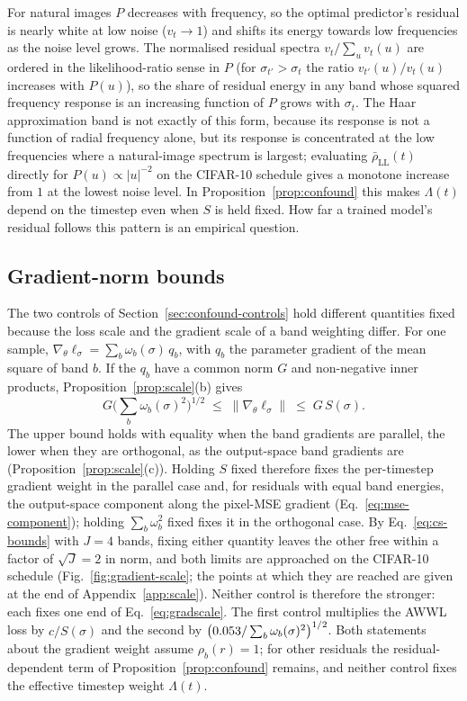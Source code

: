 For natural images $P$ decreases with frequency, so the optimal predictor's
residual is nearly white at low noise ($v_t \to 1$) and shifts its energy
towards low frequencies as the noise level grows. The normalised residual
spectra $v_t/\sum_u v_t(u)$ are ordered in the likelihood-ratio sense in $P$
(for $\sigma_{t'} > \sigma_t$ the ratio $v_{t'}(u)/v_t(u)$ increases with
$P(u)$), so the share of residual energy in any band whose squared frequency
response is an increasing function of $P$ grows with $\sigma_t$. The Haar
approximation band is not exactly of this form, because its response is not a
function of radial frequency alone, but its response is concentrated at the
low frequencies where a natural-image spectrum is largest; evaluating
$\bar\rho_{\mathrm{LL}}(t)$ directly for $P(u) \propto \lvert u \rvert^{-2}$ on
the CIFAR-10 schedule gives a monotone increase from $1$ at the lowest noise
level. In Proposition~\ref{prop:confound} this makes $\Lambda(t)$ depend on the
timestep even when $S$ is held fixed. How far a trained model's residual
follows this pattern is an empirical question.

\subsection{Gradient-norm bounds}
\label{app:gradnorm}

The two controls of Section~\ref{sec:confound-controls} hold different
quantities fixed because the loss scale and the gradient scale of a band
weighting differ. For one sample,
$\nabla_\theta \ell_\sigma = \sum_b \omega_b(\sigma)\, q_b$, with $q_b$ the
parameter gradient of the mean square of band $b$. If the $q_b$ have a common
norm $G$ and non-negative inner products, Proposition~\ref{prop:scale}(b)
gives
\begin{equation}
  G \Big(\sum_b \omega_b(\sigma)^2\Big)^{1/2}
  \;\le\; \lVert \nabla_\theta \ell_\sigma \rVert
  \;\le\; G\, S(\sigma).
  \label{eq:gradscale}
\end{equation}
The upper bound holds with equality when the band gradients are parallel, the
lower when they are orthogonal, as the output-space band gradients are
(Proposition~\ref{prop:scale}(c)). Holding $S$ fixed therefore fixes the
per-timestep gradient weight in the parallel case and, for residuals with
equal band energies, the output-space component along the pixel-MSE gradient
(Eq.~\eqref{eq:mse-component}); holding $\sum_b \omega_b^2$ fixed fixes it in
the orthogonal case. By Eq.~\eqref{eq:cs-bounds} with $J = 4$ bands, fixing
either quantity leaves the other free within a factor of $\sqrt{J} = 2$ in
norm, and both limits are approached on the CIFAR-10 schedule
(Fig.~\ref{fig:gradient-scale}; the points at which they are reached are given
at the end of Appendix~\ref{app:scale}). Neither control is therefore the
stronger: each fixes one end of Eq.~\eqref{eq:gradscale}. The first control
multiplies the AWWL loss by $c/S(\sigma)$ and the second by
$\big(0.053 / \sum_b \omega_b(\sigma)^2\big)^{1/2}$. Both statements
about the gradient weight assume $\rho_b(r) = 1$; for other residuals the
residual-dependent term of Proposition~\ref{prop:confound} remains, and
neither control fixes the effective timestep weight $\Lambda(t)$.

